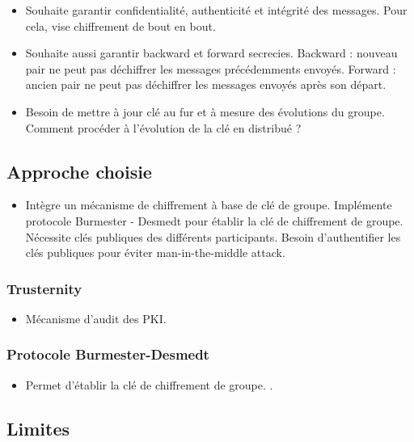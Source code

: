 \documentclass[12pt]{thesul}
\begin{document}
\begin{itemize}
  \item Souhaite garantir confidentialité, authenticité et intégrité des messages.
    Pour cela, vise chiffrement de bout en bout.
  \item Souhaite aussi garantir backward et forward secrecies.
    Backward : nouveau pair ne peut pas déchiffrer les messages précédemments envoyés.
    Forward : ancien pair ne peut pas déchiffrer les messages envoyés après son départ.
  \item Besoin de mettre à jour clé au fur et à mesure des évolutions du groupe.
    Comment procéder à l'évolution de la clé en distribué ?
\end{itemize}

\subsection{Approche choisie}

\begin{itemize}
  \item Intègre un mécanisme de chiffrement à base de clé de groupe.
    Implémente protocole Burmester - Desmedt pour établir la clé de chiffrement de groupe.
    Nécessite clés publiques des différents participants.
    Besoin d'authentifier les clés publiques pour éviter man-in-the-middle attack.
\end{itemize}

\subsubsection{Trusternity}

\begin{itemize}
  \item Mécanisme d'audit des PKI. \cite{2018-trusternity-short, 2018-trusternity-long}
\end{itemize}

\subsubsection{Protocole Burmester-Desmedt}

\begin{itemize}
  \item Permet d'établir la clé de chiffrement de groupe. \cite{1995-burmester-desmedt}.
\end{itemize}

\subsection{Limites}
\end{document}

